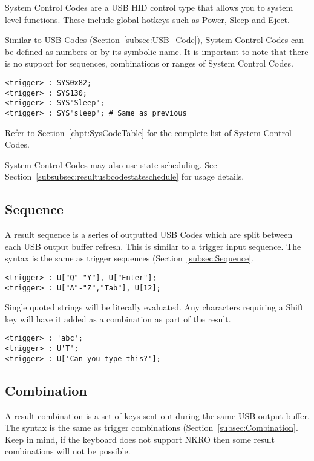 \documentclass{kiibohd-template}
\begin{document}
System Control Codes are a USB HID control type that allows you to system level functions.
These include global hotkeys such as Power, Sleep and Eject.

Similar to USB Codes (Section~\ref{subsec:USB_Code}), System Control Codes can be defined as numbers or by its symbolic name.
It is important to note that there is no support for sequences, combinations or ranges of System Control Codes.

\begin{lstlisting}
<trigger> : SYS0x82;
<trigger> : SYS130;
<trigger> : SYS"Sleep";
<trigger> : SYS"sleep"; # Same as previous
\end{lstlisting}

Refer to Section~\ref{chpt:SysCodeTable} for the complete list of System Control Codes.

System Control Codes may also use state scheduling. See Section~\ref{subsubsec:resultusbcodestateschedule} for usage details.


\subsection{Sequence}

A result sequence is a series of outputted USB Codes which are split between each USB output buffer refresh.
This is similar to a trigger input sequence.
The syntax is the same as trigger sequences (Section~\ref{subsec:Sequence}.

\begin{lstlisting}
<trigger> : U["Q"-"Y"], U["Enter"];
<trigger> : U["A"-"Z","Tab"], U[12];
\end{lstlisting}

Single quoted strings will be literally evaluated.
Any characters requiring a Shift key will have it added as a combination as part of the result.

\begin{lstlisting}
<trigger> : 'abc';
<trigger> : U'T';
<trigger> : U['Can you type this?'];
\end{lstlisting}


\subsection{Combination}

A result combination is a set of keys sent out during the same USB output buffer.
The syntax is the same as trigger combinations (Section~\ref{subsec:Combination}.
Keep in mind, if the keyboard does not support NKRO then some result combinations will not be possible.
\end{document}
